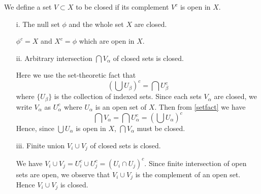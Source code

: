 \begin{solution}
    We define a set $V\subset X$ to be closed if its
  complement $V^c$ is open in $X$.

  \setlength{\parskip}{2mm}
  \begin{enumerate}
    \item[i.] The null set $\phi$ and the whole set
      $X$ are closed.

      \setlength{\parskip}{2mm}
      $\phi^c=X$ and $X^c=\phi$ which are open in $X$.
    \item[ii.] Arbitrary intersection $\bigcap{V_\alpha}$
      of closed sets is closed.

      \setlength{\parskip}{2mm}
      Here we use the set-theoretic fact that
      \begin{equation}
        \left(\bigcup U_\beta\right)^c=
      \bigcap U_\beta^c \label{setfact}
      \end{equation}
      where $\{U_\beta\}$ is the collection of
      indexed sets. Since each sets $V_\alpha$
      are closed, we write $V_\alpha$ as $U_\alpha^c$
      where $U_\alpha$ is an open set of $X$.
      Then from \ref{setfact} we have
      \begin{equation}
        \bigcap V_\alpha=\bigcap U_\alpha^c=
        \left(\bigcup U_\alpha\right)^c
      \end{equation}
      Hence, since $\bigcup U_\alpha$ is open in $X$,
      $\bigcap V_\alpha$ must be closed.

      \item[iii.] Finite union $V_i\cup V_j$ of closed sets
        is closed.

        \setlength{\parskip}{3mm}
         We have $V_i\cup V_j=U_i^c\cup U_j^c=(U_i\cap U_j)
         ^c$. Since finite intersection of open sets are
         open, we observe that $V_i\cup V_j$ is the complement
         of an open set. Hence $V_i\cup V_j$ is closed.
  \end{enumerate}
\end{solution}
